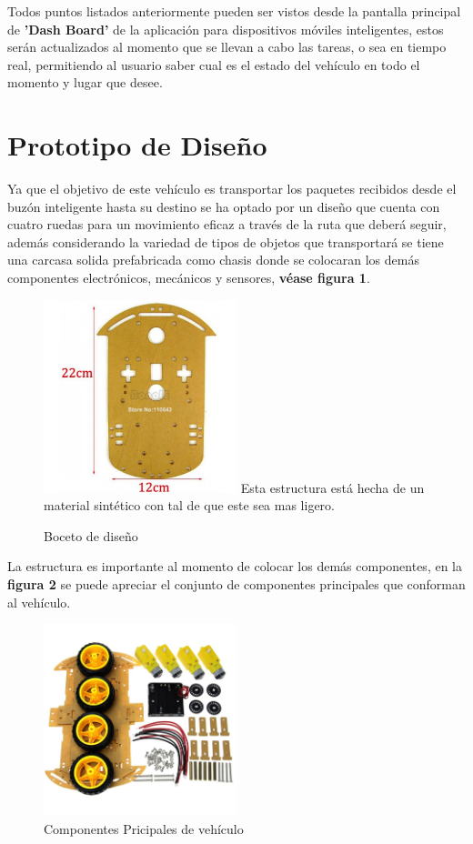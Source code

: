 \documentclass[osajnl,twocolumn,showpacs,superscriptaddress,10pt]{revtex4-1}
\begin{document}
Todos puntos listados anteriormente pueden ser vistos desde la pantalla principal de \textbf{'Dash Board'} de la aplicación para dispositivos móviles inteligentes, estos serán actualizados al momento que se llevan a cabo las tareas, o sea en tiempo real, permitiendo al usuario saber cual es el estado del vehículo en todo el momento y lugar que desee.

\section{Prototipo de Diseño}
Ya que el objetivo de este vehículo es transportar los paquetes recibidos desde el buzón inteligente hasta su destino se ha optado por un diseño que cuenta con cuatro ruedas para un movimiento eficaz a través de la ruta que deberá seguir, además considerando la variedad de tipos de objetos que transportará se tiene una carcasa solida prefabricada como chasis donde se colocaran los demás componentes electrónicos, mecánicos y sensores, \textbf{véase figura 1}.


\begin{figure} [H] \centering 
\caption{Boceto de diseño}
\includegraphics[width=0.5\textwidth]{chasis.jpg} 
Esta estructura está hecha de un material sintético con tal de que este sea mas ligero.
\end{figure}


La estructura es importante al momento de colocar los demás componentes, en la \textbf{figura 2} se puede apreciar el conjunto de componentes principales que conforman al vehículo.

\begin{figure} [H] \centering 
\caption{Componentes Pricipales de vehículo}
\includegraphics[width=0.5\textwidth]{componentes.jpg}
\end{figure}
\end{document}
